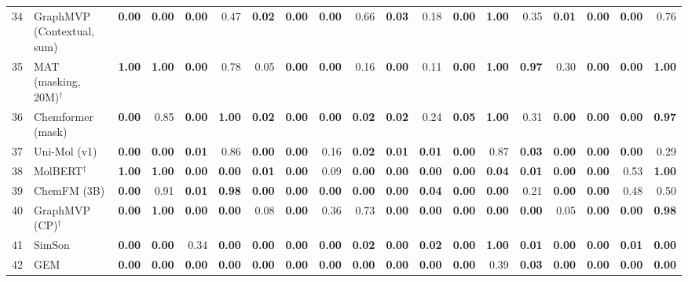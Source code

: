 \documentclass{article}
\begin{document}
\begin{table}[H]
{\begin{tabular}{@{}rlrrrrrrrrrrrrrrrrr@{}}
34 & GraphMVP (Contextual, sum) & \textbf{0.00} & \textbf{0.00} & \textbf{0.00} & 0.47 & \textbf{0.02} & \textbf{0.00} & \textbf{0.00} & 0.66 & \textbf{0.03} & 0.18 & \textbf{0.00} & \textbf{1.00} & 0.35 & \textbf{0.01} & \textbf{0.00} & \textbf{0.00} & 0.76 \\
35 & MAT (masking, 20M)$^\dagger$ & \textbf{1.00} & \textbf{1.00} & \textbf{0.00} & 0.78 & 0.05 & \textbf{0.00} & \textbf{0.00} & 0.16 & \textbf{0.00} & 0.11 & \textbf{0.00} & \textbf{1.00} & \textbf{0.97} & 0.30 & \textbf{0.00} & \textbf{0.00} & \textbf{1.00} \\
36 & Chemformer (mask) & \textbf{0.00} & 0.85 & \textbf{0.00} & \textbf{1.00} & \textbf{0.02} & \textbf{0.00} & \textbf{0.00} & \textbf{0.02} & \textbf{0.02} & 0.24 & \textbf{0.05} & \textbf{1.00} & 0.31 & \textbf{0.00} & \textbf{0.00} & \textbf{0.00} & \textbf{0.97} \\
37 & Uni-Mol (v1) & \textbf{0.00} & \textbf{0.00} & \textbf{0.01} & 0.86 & \textbf{0.00} & \textbf{0.00} & 0.16 & \textbf{0.02} & \textbf{0.01} & \textbf{0.01} & \textbf{0.00} & 0.87 & \textbf{0.03} & \textbf{0.00} & \textbf{0.00} & \textbf{0.00} & 0.29 \\
38 & MolBERT$^\dagger$ & \textbf{1.00} & \textbf{1.00} & \textbf{0.00} & \textbf{0.00} & \textbf{0.01} & \textbf{0.00} & 0.09 & \textbf{0.00} & \textbf{0.00} & \textbf{0.00} & \textbf{0.00} & \textbf{0.04} & \textbf{0.01} & \textbf{0.00} & \textbf{0.00} & 0.53 & \textbf{1.00} \\
39 & ChemFM (3B) & \textbf{0.00} & 0.91 & \textbf{0.01} & \textbf{0.98} & \textbf{0.00} & \textbf{0.00} & \textbf{0.00} & \textbf{0.00} & \textbf{0.00} & \textbf{0.04} & \textbf{0.00} & \textbf{0.00} & 0.21 & \textbf{0.00} & \textbf{0.00} & 0.48 & 0.50 \\
40 & GraphMVP (CP)$^\dagger$ & \textbf{0.00} & \textbf{1.00} & \textbf{0.00} & \textbf{0.00} & 0.08 & \textbf{0.00} & 0.36 & 0.73 & \textbf{0.00} & \textbf{0.00} & \textbf{0.00} & \textbf{0.00} & \textbf{0.00} & 0.05 & \textbf{0.00} & \textbf{0.00} & \textbf{0.98} \\
41 & SimSon & \textbf{0.00} & \textbf{0.00} & 0.34 & \textbf{0.00} & \textbf{0.00} & \textbf{0.00} & \textbf{0.00} & \textbf{0.02} & \textbf{0.00} & \textbf{0.02} & \textbf{0.00} & \textbf{1.00} & \textbf{0.01} & \textbf{0.00} & \textbf{0.00} & \textbf{0.01} & \textbf{0.00} \\
42 & GEM & \textbf{0.00} & \textbf{0.00} & \textbf{0.00} & \textbf{0.00} & \textbf{0.00} & \textbf{0.00} & \textbf{0.00} & \textbf{0.00} & \textbf{0.00} & \textbf{0.00} & \textbf{0.00} & 0.39 & \textbf{0.03} & \textbf{0.00} & \textbf{0.00} & \textbf{0.00} & \textbf{0.00} \\

\end{tabular}}
\end{table}
\end{document}
